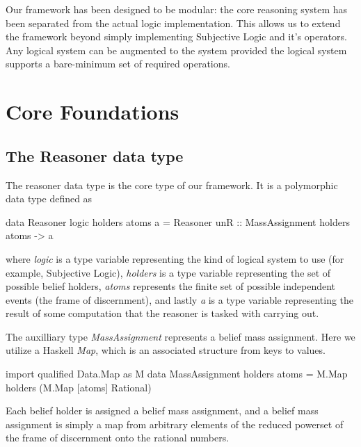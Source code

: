 \documentclass[a4paper]{report}
\begin{document}
\par
Our framework has been designed to be modular: the core reasoning system has been
separated from the actual logic implementation. This allows us to extend the framework
beyond simply implementing Subjective Logic and it's operators. Any logical system
can be augmented to the system provided the logical system supports a bare-minimum
set of required operations.



\section{Core Foundations}

\subsection{The Reasoner data type}

\par
The reasoner data type is the core type of our framework. It is a polymorphic data
type defined as

\begin{code}
  data Reasoner logic holders atoms a = Reasoner {
    unR :: MassAssignment holders atoms -> a
  }
\end{code}

where \emph{logic} is a type variable representing the kind of logical system to
use (for example, Subjective Logic), \emph{holders} is a type variable representing
the set of possible belief holders, \emph{atoms} represents the finite set of possible
independent events (the frame of discernment), and lastly \emph{a} is a type variable
representing the result of some computation that the reasoner is tasked with carrying
out.

\par
The auxilliary type \emph{MassAssignment} represents a belief mass assignment. Here
we utilize a Haskell \emph{Map}, which is an associated structure from keys to values.

\begin{code}
import qualified Data.Map as M
data MassAssignment holders atoms = M.Map holders (M.Map [atoms] Rational)
\end{code}

Each belief holder is assigned a belief mass assignment, and a belief mass assignment
is simply a map from arbitrary elements of the reduced powerset of the frame of discernment
onto the rational numbers.
\end{document}
